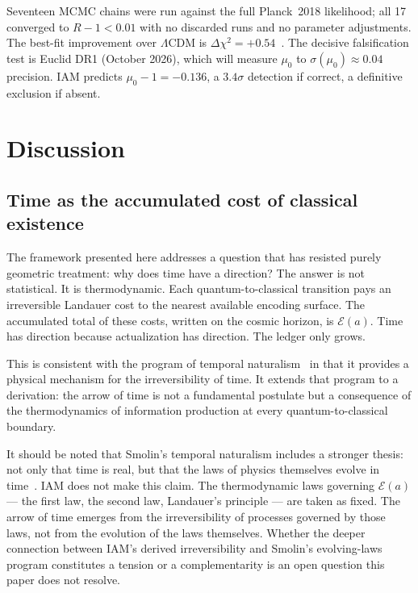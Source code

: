 \documentclass[12pt,a4paper]{article}
\begin{document}
Seventeen MCMC chains were run against the full Planck~2018 likelihood;
all 17 converged to $R-1 < 0.01$ with no discarded runs and no parameter
adjustments. The best-fit improvement over $\Lambda$CDM is
$\Delta\chi^2 = +0.54$~\citep{IAM_obs}. The decisive falsification test
is Euclid DR1 (October 2026), which will measure $\mu_0$ to
$\sigma(\mu_0) \approx 0.04$ precision. IAM predicts
$\mu_0 - 1 = -0.136$, a $3.4\sigma$ detection if correct, a definitive
exclusion if absent.

\section{Discussion}
\label{sec:discussion}

\subsection{Time as the accumulated cost of classical existence}

The framework presented here addresses a question that has resisted purely
geometric treatment: why does time have a direction? The answer is not
statistical. It is thermodynamic. Each quantum-to-classical transition
pays an irreversible Landauer cost to the nearest available encoding
surface. The accumulated total of these costs, written on the cosmic
horizon, is $\mathcal{E}(a)$. Time has direction because actualization has
direction. The ledger only grows.

This is consistent with the program of temporal naturalism~\citep{Smolin2013}
in that it provides a physical mechanism for the irreversibility of time.
It extends that program to a derivation: the arrow of time is not a
fundamental postulate but a consequence of the thermodynamics of
information production at every quantum-to-classical boundary.

It should be noted that Smolin's temporal naturalism includes a stronger
thesis: not only that time is real, but that the laws of physics themselves
evolve in time~\citep{Smolin2013}. IAM does not make this claim. The
thermodynamic laws governing $\mathcal{E}(a)$ --- the first law, the second
law, Landauer's principle --- are taken as fixed. The arrow of time
emerges from the irreversibility of processes governed by those laws, not
from the evolution of the laws themselves. Whether the deeper connection
between IAM's derived irreversibility and Smolin's evolving-laws program
constitutes a tension or a complementarity is an open question this paper
does not resolve.
\end{document}
